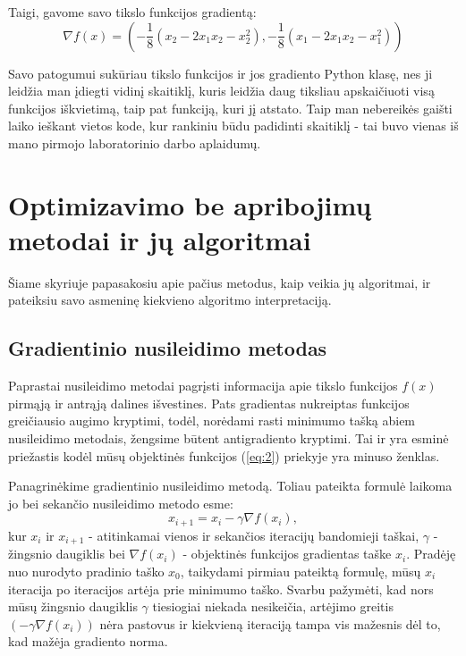 \documentclass{article}
\begin{document}
Taigi, gavome savo tikslo funkcijos gradientą:
\begin{equation}\label{eq:3}
    \nabla f(x) = (-\frac{1}{8}(x_{2}-2x_{1}x_{2}-x_{2}^2), -\frac{1}{8}(x_{1}-2x_{1}x_{2}-x_{1}^2))
\end{equation}

Savo patogumui sukūriau tikslo funkcijos ir jos gradiento Python klasę, nes ji leidžia man įdiegti vidinį skaitiklį, kuris leidžia daug tiksliau apskaičiuoti visą funkcijos iškvietimą, taip pat funkciją, kuri jį atstato. Taip man nebereikės gaišti laiko ieškant vietos kode, kur rankiniu būdu padidinti skaitiklį - tai buvo vienas iš mano pirmojo laboratorinio darbo aplaidumų.
\section{Optimizavimo be apribojimų metodai ir jų algoritmai}
Šiame skyriuje papasakosiu apie pačius metodus, kaip veikia jų algoritmai, ir pateiksiu savo asmeninę kiekvieno algoritmo interpretaciją.
\subsection{Gradientinio nusileidimo metodas}
Paprastai nusileidimo metodai pagrįsti informacija apie tikslo funkcijos $f(x)$ pirmąją ir antrąją dalines išvestines. Pats gradientas nukreiptas funkcijos greičiausio augimo kryptimi, todėl, norėdami rasti minimumo tašką abiem nusileidimo metodais, žengsime būtent antigradiento kryptimi. Tai ir yra esminė priežastis kodėl mūsų objektinės funkcijos (\ref{eq:2}) priekyje yra minuso ženklas.

Panagrinėkime gradientinio nusileidimo metodą. Toliau pateikta formulė laikoma jo bei sekančio nusileidimo metodo esme:
\begin{equation}\label{eq:4}
    x_{i+1} = x_{i} - \gamma\nabla f(x_{i}),
\end{equation}
kur $x_{i}$ ir $x_{i+1}$ - atitinkamai vienos ir sekančios iteracijų bandomieji taškai, $\gamma$ - žingsnio daugiklis bei $\nabla f(x_{i})$ - objektinės funkcijos gradientas taške $x_{i}$. Pradėję nuo nurodyto pradinio taško $x_{0}$, taikydami pirmiau pateiktą formulę, mūsų $x_{i}$ iteracija po iteracijos artėja prie minimumo taško. Svarbu pažymėti, kad nors mūsų žingsnio daugiklis $\gamma$ tiesiogiai niekada nesikeičia, artėjimo greitis $(-\gamma\nabla f(x_{i}))$ nėra pastovus ir kiekvieną iteraciją tampa vis mažesnis dėl to, kad mažėja gradiento norma.
\end{document}
